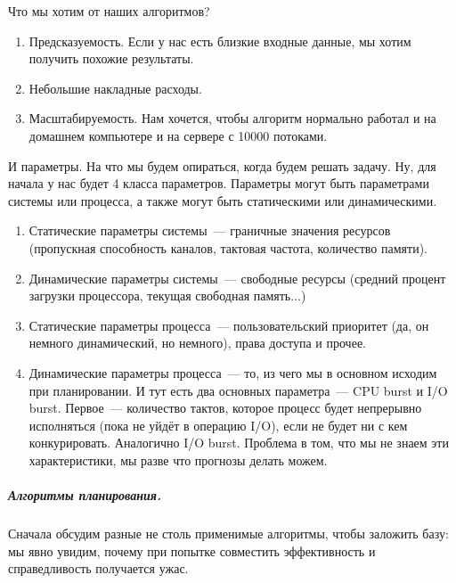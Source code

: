 \documentclass{article}
\begin{document}
    Что мы хотим от наших алгоритмов?
    \begin{enumerate}
        \item Предсказуемость. Если у нас есть близкие входные данные, мы хотим получить похожие результаты.
        \item Небольшие накладные расходы.
        \item Масштабируемость. Нам хочется, чтобы алгоритм нормально работал и на домашнем компьютере и на сервере с 10000 потоками.
    \end{enumerate}
    И параметры. На что мы будем опираться, когда будем решать задачу. Ну, для начала у нас будет 4 класса параметров. Параметры могут быть параметрами системы или процесса, а также могут быть статическими или динамическими.
    \begin{enumerate}
        \item Статические параметры системы~--- граничные значения ресурсов (пропускная способность каналов, тактовая частота, количество памяти).
        \item Динамические параметры системы~--- свободные ресурсы (средний процент загрузки процессора, текущая свободная память...)
        \item Статические параметры процесса~--- пользовательский приоритет (да, он немного динамический, но немного), права доступа и прочее.
        \item Динамические параметры процесса~--- то, из чего мы в основном исходим при планировании. И тут есть два основных параметра~--- CPU burst и I/O burst. Первое~--- количество тактов, которое процесс будет непрерывно исполняться (пока не уйдёт в операцию I/O), если не будет ни с кем конкурировать. Аналогично I/O burst. Проблема в том, что мы не знаем эти характеристики, мы разве что прогнозы делать можем.
    \end{enumerate}
    \subparagraph{Алгоритмы планирования.}
    Сначала обсудим разные не столь применимые алгоритмы, чтобы заложить базу: мы явно увидим, почему при попытке совместить эффективность и справедливость получается ужас.
\end{document}
